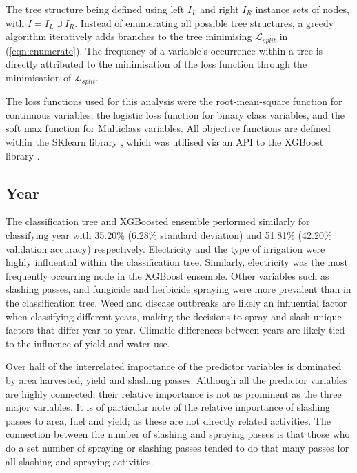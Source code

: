 \documentclass[review,12pt,authoryear]{elsarticle}
\begin{document}
\begin{linenumbers}
The tree structure being defined using left $I_L$ and right $I_R$ instance sets of nodes, with $I = I_L \cup I_R$. Instead of enumerating all possible tree structures, a greedy algorithm iteratively adds branches to the tree minimising $ \mathcal{L}_{split} $ in (\ref{eqn:enumerate}). The frequency of a variable's occurrence within a tree is directly attributed to the minimisation of the loss function through the minimisation of $ \mathcal{L}_{split} $.
\par
The loss functions used for this analysis were the root-mean-square function for continuous variables, the logistic loss function for binary class variables, and the soft max function for Multiclass variables. All objective functions are defined within the SKlearn library \citep{sklearn_api}, which was utilised via an API to the XGBoost library \citep{chenXGBoostScalableTree2016}.
\par
 \subsection{Year}

 The classification tree and XGBoosted ensemble performed similarly for classifying year with 35.20\% (6.28\% standard deviation) and 51.81\% (42.20\% validation accuracy) respectively. Electricity and the type of irrigation were highly influential within the classification tree. Similarly, electricity was the most frequently occurring node in the XGBoost ensemble. Other variables such as slashing passes, and fungicide and herbicide spraying were more prevalent than in the classification tree. Weed and disease outbreaks are likely an influential factor when classifying different years, making the decisions to spray and slash unique factors that differ year to year. Climatic differences between years are likely tied to the influence of yield and water use.
 \par
 Over half of the interrelated importance of the predictor variables is dominated by area harvested, yield and slashing passes. Although all the predictor variables are highly connected, their relative importance is not as prominent as the three major variables. It is of particular note of the relative importance of slashing passes to area, fuel and yield; as these are not directly related activities. The connection between the number of slashing and spraying passes is that those who do a set number of spraying or slashing passes tended to do that many passes for all slashing and spraying activities.
 

\end{linenumbers}
\end{document}
